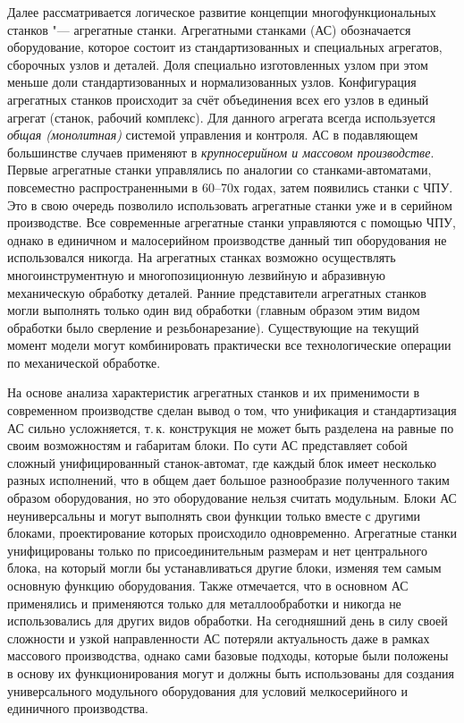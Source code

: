 Далее рассматривается логическое развитие концепции многофункциональных станков "--- агрегатные станки. Агрегатными станками (АС) обозначается оборудование, которое состоит из стандартизованных и специальных агрегатов, сборочных узлов и деталей. Доля специально изготовленных узлом при этом меньше доли стандартизованных и нормализованных узлов. Конфигурация агрегатных станков происходит за счёт объединения всех его узлов в единый агрегат (станок, рабочий комплекс). Для данного агрегата всегда используется \textit{общая (монолитная)} системой управления и контроля. АС в подавляющем большинстве случаев применяют в \textit{крупносерийном и массовом производстве}. Первые агрегатные станки управлялись по аналогии со станками-автоматами, повсеместно распространенными в 60--70х годах, затем появились станки с ЧПУ. Это в свою очередь позволило использовать агрегатные станки уже и в серийном производстве. Все современные агрегатные станки управляются с помощью ЧПУ, однако в единичном и малосерийном производстве данный тип оборудования не использовался никогда. На агрегатных станках возможно осуществлять многоинструментную и многопозиционную лезвийную и абразивную механическую обработку деталей. Ранние представители агрегатных станков могли выполнять только один вид обработки (главным образом этим видом обработки было сверление и резьбонарезание). Существующие на текущий момент модели могут комбинировать практически все технологические операции по механической обработке.

На основе анализа характеристик агрегатных станков и их применимости в современном производстве сделан вывод о том, что унификация и стандартизация АС сильно усложняется, т.\,к. конструкция не может быть разделена на равные по своим возможностям и габаритам блоки. По сути АС представляет собой сложный унифицированный станок-автомат, где каждый блок имеет несколько разных исполнений, что в общем дает большое разнообразие полученного таким образом оборудования, но это оборудование нельзя считать модульным. Блоки АС неуниверсальны и могут выполнять свои функции только вместе с другими блоками, проектирование которых происходило одновременно. Агрегатные станки унифицированы только по присоединительным размерам и нет центрального блока, на который могли бы устанавливаться другие блоки, изменяя тем самым основную функцию оборудования. Также отмечается, что в основном АС применялись и применяются только для металлообработки и никогда не использовались для других видов обработки. На сегодняшний день в силу своей сложности и узкой направленности АС потеряли актуальность даже в рамках массового производства, однако сами базовые подходы, которые были положены в основу их функционирования могут и должны быть использованы для создания универсального модульного оборудования для условий мелкосерийного и единичного производства.


